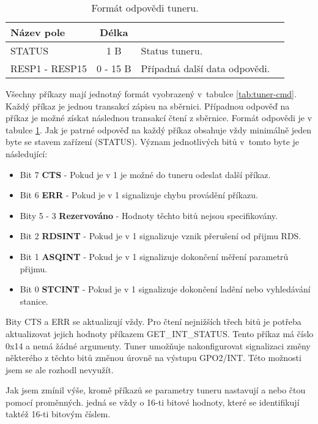 \begin{table}[ht!]
\begin{center}
\begin{tabular}{|l|c|l|l|}
\hline 
Název pole & Délka &  \\ 
\hline
STATUS & 1 B & Status tuneru.\\
\hline
RESP1 - RESP15 & 0 - 15 B & Případná další data odpovědi.\\
\hline
\end{tabular} 
\end{center}
\caption{Formát odpovědi tuneru.}
\label{tab:tuner-rpl} 
\end{table}

Všechny příkazy mají jednotný formát vyobrazený v~tabulce \ref{tab:tuner-cmd}. Každý příkaz je jednou transakcí zápisu na \iic sběrnici. Případnou odpověď na příkaz je možné získat následnou transakcí čtení z \iic sběrnice. Formát odpovědi je v tabulce \ref{tab:tuner-rpl}. Jak je patrné odpověď na každý příkaz obsahuje vždy minimálně jeden byte se stavem zařízení (STATUS). Význam jednotlivých bitů v~tomto byte je následující:

\begin{itemize}
\item Bit 7 \textbf{CTS} - Pokud je v 1 je možné do tuneru odeslat další příkaz.
\item Bit 6 \textbf{ERR} - Pokud je v 1 signalizuje chybu provádění příkazu.
\item Bity 5 - 3 \textbf{Rezervováno} - Hodnoty těchto bitů nejsou specifikovány.
\item Bit 2 \textbf{RDSINT} - Pokud je v 1 signalizuje vznik přerušení od přijmu RDS.
\item Bit 1 \textbf{ASQINT} - Pokud je v 1 signalizuje dokončení měření parametrů přijmu.
\item Bit 0 \textbf{STCINT} - Pokud je v 1 signalizuje dokončení ladění nebo vyhledávání stanice.
\end{itemize}  

Bity CTS a ERR se aktualizují vždy. Pro čtení nejnižších třech bitů je potřeba aktualizovat jejich hodnoty příkazem GET\_INT\_STATUS. Tento příkaz má číslo 0x14 a nemá žádné argumenty. Tuner umožňuje nakonfigurovat signalizaci změny některého z těchto bitů změnou úrovně na výstupu GPO2/INT. Této možnosti jsem se ale rozhodl nevyužít.

Jak jsem zmínil výše, kromě příkazů se parametry tuneru nastavují a nebo čtou pomocí proměnných. jedná se vždy o 16-ti bitové hodnoty, které se identifikují taktéž 16-ti bitovým číslem. 

